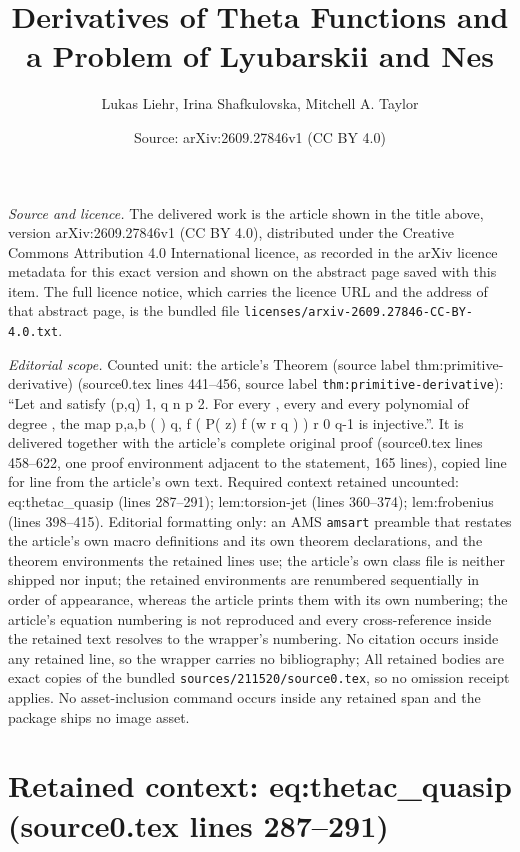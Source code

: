 \documentclass[10pt,a4paper]{amsart}
\title[Derivatives of Theta Functions and a Problem of Lyubarskii and Nes]{Derivatives of Theta Functions and a Problem of Lyubarskii and Nes}
\author{Lukas Liehr, Irina Shafkulovska, Mitchell A. Taylor}
\date{Source: arXiv:2609.27846v1 (CC BY 4.0)}
\theoremstyle{plain}
\begin{document}
\maketitle

\noindent\emph{Source and licence.} The delivered work is the article shown in the title above, version arXiv:2609.27846v1 (CC BY 4.0), distributed under the Creative Commons Attribution 4.0 International licence, as recorded in the arXiv licence metadata for this exact version and shown on the abstract page saved with this item. The full licence notice, which carries the licence URL and the address of that abstract page, is the bundled file \texttt{licenses/arxiv-2609.27846-CC-BY-4.0.txt}.
\par\smallskip

\noindent\textit{Editorial scope.} Counted unit: the article's Theorem (source label thm:primitive-derivative) (source0.tex lines 441--456, source label \texttt{thm:primitive-derivative}): ``Let and satisfy (p,q) 1, q n p 2. For every , every and every polynomial of degree , the map p,a,b ( ) q, f ( P( z) f (w r q ) ) r 0 q-1 is injective.''. It is delivered together with the article's complete original proof (source0.tex lines 458--622, one proof environment adjacent to the statement, 165 lines), copied line for line from the article's own text. Required context retained uncounted: eq:thetac\_quasip (lines 287--291); lem:torsion-jet (lines 360--374); lem:frobenius (lines 398--415). Editorial formatting only: an AMS \texttt{amsart} preamble that restates the article's own macro definitions and its own theorem declarations, and the theorem environments the retained lines use; the article's own class file is neither shipped nor input; the retained environments are renumbered sequentially in order of appearance, whereas the article prints them with its own numbering; the article's equation numbering is not reproduced and every cross-reference inside the retained text resolves to the wrapper's numbering. No citation occurs inside any retained line, so the wrapper carries no bibliography; All retained bodies are exact copies of the bundled \texttt{sources/211520/source0.tex}, so no omission receipt applies. No asset-inclusion command occurs inside any retained span and the package ships no image asset.


\section*{Retained context: eq:thetac\_quasip (source0.tex lines 287--291)}
\end{document}
